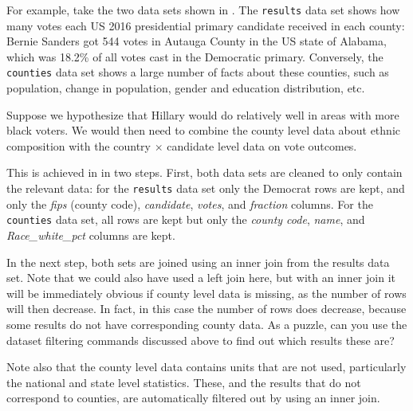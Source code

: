 For example, take the two data sets shown in .
The \texttt{results} data set shows how many votes each US 2016 presidential primary candidate received in each county:
Bernie Sanders got 544 votes in Autauga County in the US state of Alabama, which was 18.2\% of all votes cast in the
Democratic primary.
Conversely, the \texttt{counties} data set shows a large number of facts about these counties,
such as population, change in population, gender and education distribution, etc. 


Suppose we hypothesize that Hillary would do relatively well in areas with more black voters.
We would then need to combine the county level data about ethnic composition with the country $\times$ candidate
level data on vote outcomes.

This is achieved in  in two steps.
First, both data sets are cleaned to only contain the relevant data:
for the \texttt{results} data set only the Democrat rows are kept, and only the \emph{fips} (county code), \emph{candidate}, \emph{votes}, and \emph{fraction} columns.
For the \texttt{counties} data set, all rows are kept but only the \emph{county code}, \emph{name}, and \emph{Race\_white\_pct} columns are kept.


In the next step, both sets are joined using an inner join from the results data set.
Note that we could also have used a left join here, but with an inner join it will be immediately
obvious if county level data is missing, as the number of rows will then decrease.
In fact, in this case the number of rows does decrease, because some results do not have corresponding county data.
As a puzzle, can you use the dataset filtering commands discussed above to find out which results these are?

Note also that the county level data contains units that are not used, particularly the national and state level statistics.
These, and the results that do not correspond to counties, are automatically filtered out by using an inner join.

